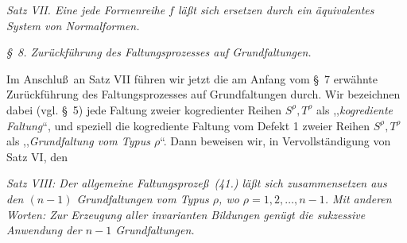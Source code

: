 \emph{Satz VII. Eine jede Formenreihe $f$ l\"a\ss t sich ersetzen durch ein \"aquivalentes System von Normalformen.}

\begin{center}
\emph{\S\ 8. Zur\"uckf\"uhrung des Faltungsprozesses auf Grundfaltungen.}
\end{center}
Im Anschlu\ss\ an Satz VII f\"uhren wir jetzt die am Anfang vom \S\ 7 erw\"ahnte Zur\"uckf\"uhrung des Faltungsprozesses auf Grundfaltungen durch. Wir bezeichnen dabei (vgl. \S\ 5) jede Faltung zweier kogredienter Reihen $S^\rho,T^\rho$ als ,,\emph{kogrediente Faltung}``, und speziell die kogrediente Faltung vom Defekt 1 zweier Reihen $S^\rho,T^\rho$ als ,,\emph{Grundfaltung vom Typus $\rho$}``. Dann beweisen wir, in Vervollst\"andigung von Satz VI, den

\emph{Satz VIII: Der allgemeine Faltungsproze\ss\ (41.) l\"a\ss t sich zusammensetzen aus den $(n-1)$ Grundfaltungen vom Typus $\rho$, wo $\rho=1,2,\ldots,n-1$. Mit anderen Worten: Zur Erzeugung aller invarianten Bildungen gen\"ugt die sukzessive Anwendung der $n-1$ Grundfaltungen.}

